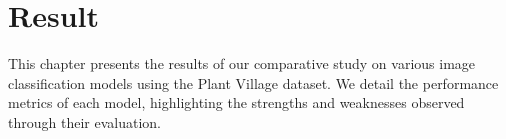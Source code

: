 \chapter{Result}

This chapter presents the results of our comparative study on various image classification models using the Plant Village dataset. We detail the performance metrics of each model, highlighting the strengths and weaknesses observed through their evaluation. \par\vspace{1em}
\par\vspace{1em}


